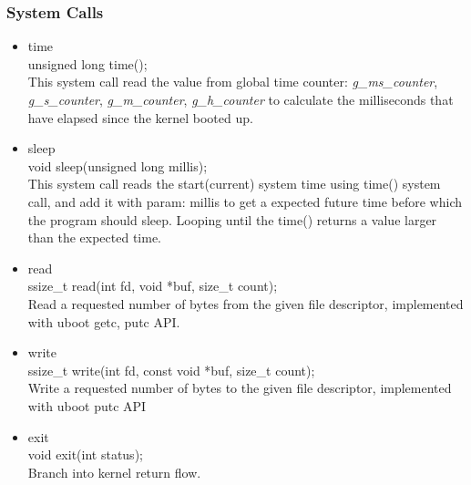 \documentclass{article}
\begin{document}
\subsubsection{System Calls}
\begin{itemize}
\item{time}\\
	unsigned long time();\\
	\newline
	{This system call read the value from global time counter: {\it g\_ms\_counter}, {\it g\_s\_counter}, {\it g\_m\_counter}, {\it g\_h\_counter} to calculate the milliseconds that have elapsed since the kernel booted up.}

\item{sleep}\\
	void sleep(unsigned long millis);\\
	\newline
	{This system call reads the start(current) system time using time() system call, and add it with param: millis to get a expected future time before which the program should sleep. Looping until the time() returns a value larger than the expected time.}

\item{read}\\
	ssize\_t read(int fd, void *buf, size\_t count);\\
	\newline
	{Read a requested number of bytes from the given file descriptor, implemented with uboot getc, putc API.}

\item{write}\\
	ssize\_t write(int fd, const void *buf, size\_t count);\\
	\newline
	{Write a requested number of bytes to the given file descriptor, implemented with uboot putc API}

\item{exit}\\
	void exit(int status);\\
	\newline
	{Branch into kernel return flow.}
\end{itemize}

\end{document}
